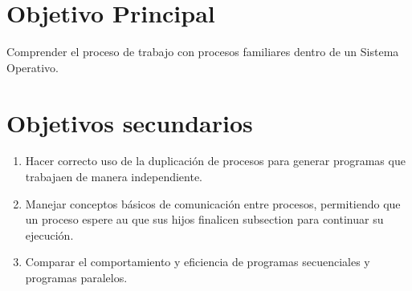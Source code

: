 \section{Objetivo Principal}
Comprender el proceso de trabajo con procesos familiares dentro de un Sistema Operativo.

\section{Objetivos secundarios}
\begin{enumerate}
    \item Hacer correcto uso de la duplicación de procesos para generar programas que trabajaen de manera independiente.
    \item Manejar conceptos básicos de comunicación entre procesos, permitiendo que un proceso espere au que sus hijos finalicen subsection para continuar su ejecución.
    \item Comparar el comportamiento y eficiencia de programas secuenciales y programas paralelos.
\end{enumerate}